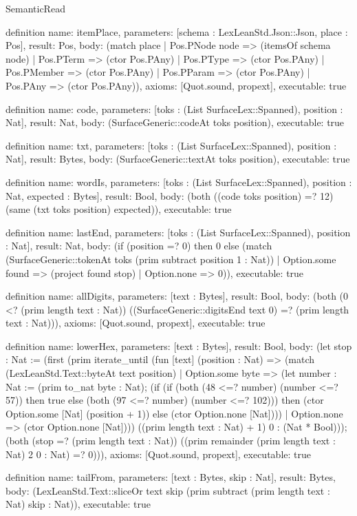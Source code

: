 \begin{lexlean}{SemanticRead}
\begin{semanticmodule}
definition{
  name: itemPlace,
  parameters: [schema : LexLeanStd.Json::Json, place : Pos],
  result: Pos,
  body: (match place
    | Pos.PNode node => (itemsOf schema node)
    | Pos.PTerm => (ctor Pos.PAny)
    | Pos.PType => (ctor Pos.PAny)
    | Pos.PMember => (ctor Pos.PAny)
    | Pos.PParam => (ctor Pos.PAny)
    | Pos.PAny => (ctor Pos.PAny)),
  axioms: [Quot.sound, propext],
  executable: true
}

definition{
  name: code,
  parameters: [toks : (List SurfaceLex::Spanned), position : Nat],
  result: Nat,
  body: (SurfaceGeneric::codeAt toks position),
  executable: true
}

definition{
  name: txt,
  parameters: [toks : (List SurfaceLex::Spanned), position : Nat],
  result: Bytes,
  body: (SurfaceGeneric::textAt toks position),
  executable: true
}

definition{
  name: wordIs,
  parameters: [toks : (List SurfaceLex::Spanned), position : Nat, expected : Bytes],
  result: Bool,
  body: (both ((code toks position) =? 12) (same (txt toks position) expected)),
  executable: true
}

definition{
  name: lastEnd,
  parameters: [toks : (List SurfaceLex::Spanned), position : Nat],
  result: Nat,
  body: (if (position =? 0) then 0 else (match (SurfaceGeneric::tokenAt toks (prim subtract position 1 : Nat))
    | Option.some found => (project found stop)
    | Option.none => 0)),
  executable: true
}

definition{
  name: allDigits,
  parameters: [text : Bytes],
  result: Bool,
  body: (both (0 <? (prim length text : Nat)) ((SurfaceGeneric::digitsEnd text 0) =? (prim length text : Nat))),
  axioms: [Quot.sound, propext],
  executable: true
}

definition{
  name: lowerHex,
  parameters: [text : Bytes],
  result: Bool,
  body: (let stop : Nat := (first (prim iterate_until (fun [text] (position : Nat) => (match (LexLeanStd.Text::byteAt text position)
    | Option.some byte => (let number : Nat := (prim to_nat byte : Nat); (if (if (both (48 <=? number) (number <=? 57)) then true else (both (97 <=? number) (number <=? 102))) then (ctor Option.some [Nat] (position + 1)) else (ctor Option.none [Nat])))
    | Option.none => (ctor Option.none [Nat]))) ((prim length text : Nat) + 1) 0 : (Nat * Bool))); (both (stop =? (prim length text : Nat)) ((prim remainder (prim length text : Nat) 2 0 : Nat) =? 0))),
  axioms: [Quot.sound, propext],
  executable: true
}

definition{
  name: tailFrom,
  parameters: [text : Bytes, skip : Nat],
  result: Bytes,
  body: (LexLeanStd.Text::sliceOr text skip (prim subtract (prim length text : Nat) skip : Nat)),
  executable: true
}


\end{semanticmodule}
\end{lexlean}
